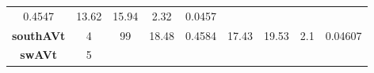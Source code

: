 \documentclass[]{article}
\theoremstyle{definition}
\theoremstyle{definition}
\theoremstyle{definition}
\theoremstyle{remark}
\begin{document}
\begin{longtable}[]{@{}ccccccccc@{}}
\begin{minipage}[t]{0.08\columnwidth}
0.4547\strut
\end{minipage} & \begin{minipage}[t]{0.08\columnwidth}\centering\strut
13.62\strut
\end{minipage} & \begin{minipage}[t]{0.07\columnwidth}\centering\strut
15.94\strut
\end{minipage} & \begin{minipage}[t]{0.07\columnwidth}\centering\strut
2.32\strut
\end{minipage} & \begin{minipage}[t]{0.08\columnwidth}\centering\strut
0.0457\strut
\end{minipage}\tabularnewline
\begin{minipage}[t]{0.14\columnwidth}\centering\strut
\textbf{southAVt}\strut
\end{minipage} & \begin{minipage}[t]{0.06\columnwidth}\centering\strut
4\strut
\end{minipage} & \begin{minipage}[t]{0.05\columnwidth}\centering\strut
99\strut
\end{minipage} & \begin{minipage}[t]{0.11\columnwidth}\centering\strut
18.48\strut
\end{minipage} & \begin{minipage}[t]{0.08\columnwidth}\centering\strut
0.4584\strut
\end{minipage} & \begin{minipage}[t]{0.08\columnwidth}\centering\strut
17.43\strut
\end{minipage} & \begin{minipage}[t]{0.07\columnwidth}\centering\strut
19.53\strut
\end{minipage} & \begin{minipage}[t]{0.07\columnwidth}\centering\strut
2.1\strut
\end{minipage} & \begin{minipage}[t]{0.08\columnwidth}\centering\strut
0.04607\strut
\end{minipage}\tabularnewline
\begin{minipage}[t]{0.14\columnwidth}\centering\strut
\textbf{swAVt}\strut
\end{minipage} & \begin{minipage}[t]{0.06\columnwidth}\centering\strut
5\strut
\end{minipage} & \begin{minipage}[t]{0.05\columnwidth}\centering\strut

\end{minipage}
\end{longtable}
\end{document}
